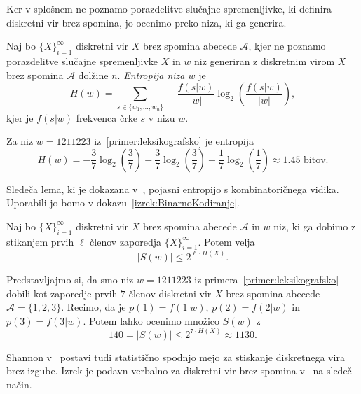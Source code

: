 \documentclass[fin1, tisk]{fmfdelo}
\providecommand{\abs}[1]{\left\lvert #1 \right\rvert}
\newcommand{\A}{\mathcal{A}}
\theoremstyle{definition}
\begin{document}
Ker v splošnem ne poznamo porazdelitve slučajne spremenljivke, ki definira diskretni vir brez
spomina, jo ocenimo preko niza, ki ga generira.

\begin{definicija}
    Naj bo $\{ X \}_{i=1}^{\infty}$ diskretni vir $X$ brez spomina abecede $\A$, kjer ne 
    poznamo porazdelitve slučajne spremenljivke $X$ in $w$ niz generiran z diskretnim virom $X$
    brez spomina $\A$ dolžine $n$.
    \emph{Entropija niza $w$} je
    \[
        H(w) = \sum_{s \in \{ w_1, \ldots, w_n \}} - \frac{f(s|w)}{\abs{w}} 
        \log_2 \left( \frac{f(s|w)}{\abs{w}} \right),
    \]
    kjer je $f(s|w)$ frekvenca črke $s$ v nizu $w$.
\end{definicija}

\begin{primer}\label{primer:EntropijaNiza}
    Za niz $w =1211223$ iz~\ref{primer:leksikografsko} je entropija
    \[
        H(w) = 
        - \frac{3}{7} \log_2 \left( \frac{3}{7} \right)
        - \frac{3}{7} \log_2 \left( \frac{3}{7} \right)
        - \frac{1}{7} \log_2 \left( \frac{1}{7} \right)
        \approx 1.45 \text{ bitov}.
    \]
\end{primer}

Sledeča lema, ki je dokazana v~\cite[Lema 2.3]{CsiszarKorner2011}, pojasni entropijo s 
kombinatoričnega vidika. Uporabili jo bomo v dokazu~\ref{izrek:BinarnoKodiranje}.

\begin{lema}\label{lema:ocena}
    Naj bo $\{ X \}_{i=1}^{\infty}$ diskretni vir $X$ brez spomina abecede $\A$ in  
    $w$ niz, ki ga dobimo z stikanjem prvih $\ell$ členov zaporedja $\{ X \}_{i=1}^{\infty}$.
    Potem velja 
    \[
        \abs{S(w)} \leq 2^{\ell \cdot H(X)}.
    \] 
\end{lema}

\begin{primer}
    Predstavljajmo si, da smo niz $w=1211223$ iz primera~\ref{primer:leksikografsko} dobili kot 
    zaporedje prvih $7$ členov diskretni vir $X$ brez spomina abecede $\A = \{ 1,2,3 \}$. 
    Recimo, da je $p(1) = f(1|w)$, $p(2) = f(2|w)$ in $p(3) = f(3|w)$. Potem lahko ocenimo
    množico $S(w)$ z
    \[
        140 = \abs{S(w)} \leq 2^{7 \cdot H(X)} \approx 1130.
    \]
\end{primer}

Shannon v~\cite{Shannon1949} postavi tudi statistično spodnjo mejo za stiskanje diskretnega
vira brez izgube. Izrek je podavn verbalno za diskretni vir brez spomina 
v~\cite[1. poglavje, 4. razdelek]{Mackay2003} na sledeč način.
\end{document}
